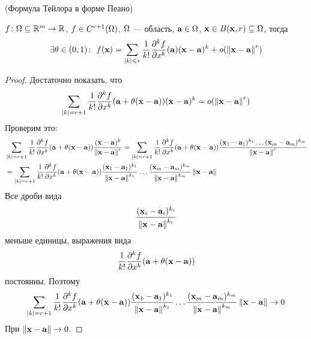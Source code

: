 \begin{theorem}(Формула Тейлора в форме Пеано)

    $f \colon \Omega \subseteq \mathbb{R}^m \to \mathbb{R}$, $f \in C^{r+1}(\Omega)$, $\Omega$ --- область,
    $\mathbf{a} \in \Omega$, $\mathbf{x} \in B(\mathbf{x}, r) \subseteq \Omega$, тогда
\[
    \exists \theta \in (0, 1)\colon~
    f(\mathbf{x}) = \sum_{|k| \leqslant r}{\frac{1}{k!}
    \frac{\partial^k f}{\partial x^k}(\mathbf{a}) (\mathbf{x} - \mathbf{a})^k}
    + o(\left\lVert\mathbf{x} - \mathbf{a}\right\rVert^r)
\]
\end{theorem}
\begin{proof}
    Достаточно показать, что
\[
    \sum_{|k| = r+1}{\frac{1}{k!} \frac{\partial^k f}{\partial x^k}(\mathbf{a} +
    \theta(\mathbf{x} - \mathbf{a}))(\mathbf{x} - \mathbf{a})^k} = o(\left\lVert\mathbf{x} - \mathbf{a}\right\rVert^r)
\]
    Проверим это:
\begin{align*}
    &\sum_{|k| = r+1}{\frac{1}{k!} \frac{\partial^k f}{\partial x^k}(\mathbf{a} +
    \theta(\mathbf{x} - \mathbf{a})) \frac{(\mathbf{x} - \mathbf{a})^k}{\left\lVert\mathbf{x} - \mathbf{a}\right\rVert^r}}
    = \sum_{|k| = r+1}{\frac{1}{k!} \frac{\partial^k f}{\partial x^k}(\mathbf{a} +
    \theta(\mathbf{x} - \mathbf{a})) \frac{(\mathbf{x}_1 - \mathbf{a}_1)^{k_1} \ldots (\mathbf{x}_m -
    \mathbf{a}_m)^{k_m}}{\left\lVert\mathbf{x} - \mathbf{a}\right\rVert^r}} \\
    &= \sum_{|k| = r+1}{\frac{1}{k!} \frac{\partial^k f}{\partial x^k}(\mathbf{a} +
    \theta(\mathbf{x} - \mathbf{a})) \frac{(\mathbf{x}_1 - \mathbf{a}_1)^{k_1}}{\left\lVert\mathbf{x} - \mathbf{a}\right\rVert^{k_1}} \ldots
    \frac{(\mathbf{x}_m - \mathbf{a}_m)^{k_m}}{\left\lVert\mathbf{x} - \mathbf{a}\right\rVert^{k_m}}} \left\lVert\mathbf{x} - \mathbf{a}\right\rVert
\end{align*}
    Все дроби вида
\[
    \frac{(\mathbf{x}_i - \mathbf{a}_i)^{k_i}}{\left\lVert\mathbf{x} - \mathbf{a}\right\rVert^{k_i}}
\]
    меньше единицы, выражения вида
\[
    \frac{1}{k!} \frac{\partial^k f}{\partial x^k}(\mathbf{a} + \theta(\mathbf{x} - \mathbf{a}))
\]
    постоянны. Поэтому
\[
    \sum_{|k| = r+1}{\frac{1}{k!} \frac{\partial^k f}{\partial x^k}(\mathbf{a} +
    \theta(\mathbf{x} - \mathbf{a})) \frac{(\mathbf{x}_1 - \mathbf{a}_1)^{k_1}}{\left\lVert\mathbf{x} - \mathbf{a}\right\rVert^{k_1}}
    \ldots \frac{(\mathbf{x}_m - \mathbf{a}_m)^{k_m}}{\left\lVert\mathbf{x} - \mathbf{a}\right\rVert^{k_m}}} \left\lVert\mathbf{x} -
    \mathbf{a}\right\rVert \to 0
\]
    При $\left\lVert\mathbf{x} - \mathbf{a}\right\rVert \to 0$.
\end{proof}
